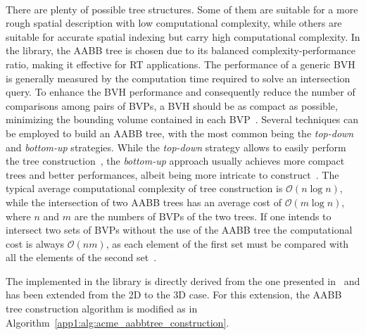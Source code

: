 \paragraph{\AabbTree{}}
There are plenty of possible tree structures. Some of them are suitable for a more rough spatial description with low computational complexity, while others are suitable for accurate spatial indexing but carry high computational complexity. In the \Acme{} library, the \ac{AABB} tree is chosen due to its balanced complexity-performance ratio, making it effective for \ac{RT} applications. The performance of a generic \ac{BVH} is generally measured by the computation time required to solve an intersection query. To enhance the \ac{BVH} performance and consequently reduce the number of comparisons among pairs of \acp{BVP}, a \ac{BVH} should be as compact as possible, minimizing the bounding volume contained in each \ac{BVP}~\cite{asyrani2012bounding, eloe2014dual}. Several techniques can be employed to build an \ac{AABB} tree, with the most common being the \emph{top-down} and \emph{bottom-up} strategies. While the \emph{top-down} strategy allows to easily perform the tree construction~\cite{eloe2014dual, ericson2004realtime, asyrani2012bounding}, the \emph{bottom-up} approach usually achieves more compact trees and better performances, albeit being more intricate to construct~\cite{omohundro1989five, asyrani2012bounding}. The typical average computational complexity of tree construction is $\mathcal{O}(n\log{n})$, while the intersection of two \ac{AABB} trees has an average cost of $\mathcal{O}(m\log{n})$, where $n$ and $m$ are the numbers of \acp{BVP} of the two trees. If one intends to intersect two sets of \acp{BVP} without the use of the \ac{AABB} tree the computational cost is always $\mathcal{O}(nm)$, as each element of the first set must be compared with all the elements of the second set~\cite{xing2010efficient}.

The \AabbTree{} implemented in the \Acme{} library is directly derived from the one presented in~\cite{frego2019pointcoloud, bertolazzi2020efficient} and has been extended from the \ac{2D} to the \ac{3D} case. For this extension, the \ac{AABB} tree construction algorithm is modified as in Algorithm~\ref{app1:alg:acme_aabbtree_construction}.

